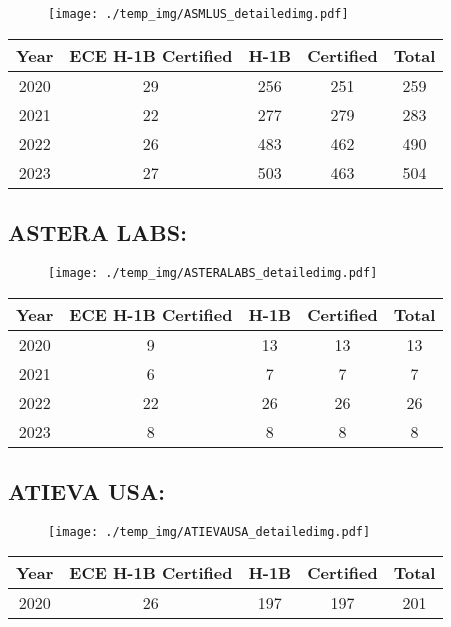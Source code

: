 \documentclass{article}%
\begin{document}
\begin{figure}[htbp]%
\centering%
\texttt{[image: ./temp\_img/ASMLUS\_detailedimg.pdf]}%
\end{figure}

%
\begin{longtable}{c|c|c|c|c}%
\hline%
Year&ECE H{-}1B Certified&H{-}1B&Certified&Total\\%
\hline%
2020&29&256&251&259\\%
\hline%
2021&22&277&279&283\\%
\hline%
2022&26&483&462&490\\%
\hline%
2023&27&503&463&504\\%
\hline%
\end{longtable}

%
\newpage%
\subsection{ASTERA LABS:}%
\label{subsec:ASTERALABS}%
\label{ASTERALABSdetailed}%


\begin{figure}[htbp]%
\centering%
\texttt{[image: ./temp\_img/ASTERALABS\_detailedimg.pdf]}%
\end{figure}

%
\begin{longtable}{c|c|c|c|c}%
\hline%
Year&ECE H{-}1B Certified&H{-}1B&Certified&Total\\%
\hline%
2020&9&13&13&13\\%
\hline%
2021&6&7&7&7\\%
\hline%
2022&22&26&26&26\\%
\hline%
2023&8&8&8&8\\%
\hline%
\end{longtable}

%
\newpage%
\subsection{ATIEVA USA:}%
\label{subsec:ATIEVAUSA}%
\label{ATIEVAUSAdetailed}%


\begin{figure}[htbp]%
\centering%
\texttt{[image: ./temp\_img/ATIEVAUSA\_detailedimg.pdf]}%
\end{figure}

%
\begin{longtable}{c|c|c|c|c}%
\hline%
Year&ECE H{-}1B Certified&H{-}1B&Certified&Total\\%
\hline%
2020&26&197&197&201\\%
\hline%
\end{longtable}
\end{document}
